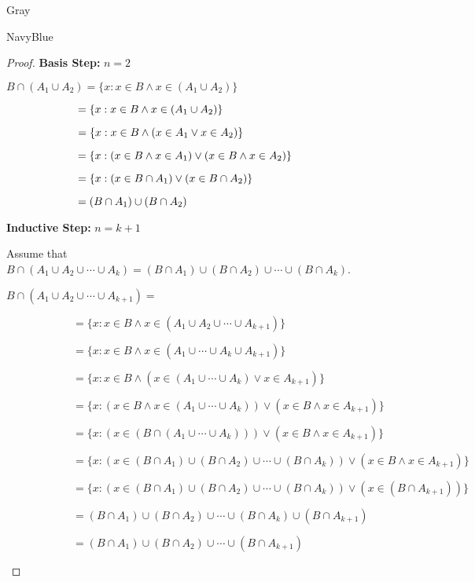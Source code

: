 \documentclass[12pt]{amsart}
\theoremstyle{named}
\newenvironment{prf}
{\medskip\begin{color}{Gray}\begin{framed}\begin{color}{NavyBlue}\begin{proof}[Proof]
\doublespacing}
{\end{proof}\end{color}\end{framed}\end{color}\medskip}
\theoremstyle{definition}
\begin{document}
\begin{prf}
	\phantom{ }

	\textbf{Basis Step:} $n = 2$
	\begin{adjustwidth}{2em}{0em}
		$B \cap (A_1 \cup A_2) = \{x : x \in B \land x \in (A_1 \cup A_2)\}$

		$\hspace{6.46em} = \{x : x \in B \land x \in (A_1 \cup A_2)\}$

		$\hspace{6.46em} = \{x : x \in B \land (x \in A_1 \lor x \in A_2)\}$

		$\hspace{6.46em} = \{x : (x \in B \land x \in A_1) \lor (x \in B \land x \in A_2)\}$

		$\hspace{6.46em} = \{x : (x \in B \cap A_1) \lor (x \in B \cap A_2)\}$

		$\hspace{6.46em} = (B \cap A_1) \cup (B \cap A_2)$
	\end{adjustwidth}

	\textbf{Inductive Step:} $n = k + 1$
	\begin{adjustwidth}{2em}{0em}
		Assume that $B\cap(A_1\cup A_2\cup \cdots\cup A_k) = (B\cap A_1)\cup (B\cap A_2) \cup \cdots \cup (B\cap A_k)$.

		\phantom{ }

		$B\cap(A_1\cup A_2\cup \cdots\cup A_{k+1}) =$

		$\hspace{6em}= \{x : x \in B \land x \in (A_1\cup A_2\cup \cdots\cup A_{k+1})\}$

		$\hspace{6em}= \{x : x \in B \land x \in (A_1\cup \cdots\cup A_k \cup A_{k+1})\}$

		$\hspace{6em}= \{x : x \in B \land (x \in (A_1\cup \cdots\cup A_k) \lor x \in A_{k+1})\}$

		$\hspace{6em}= \{x : (x \in B \land x \in (A_1\cup \cdots\cup A_k)) \lor (x \in B \land x \in A_{k+1})\}$

		$\hspace{6em}= \{x : (x \in (B \cap (A_1\cup \cdots\cup A_k))) \lor (x \in B \land x \in A_{k+1})\}$

		$\hspace{6em}= \{x : (x \in (B\cap A_1)\cup (B\cap A_2) \cup \cdots \cup (B\cap A_k)) \lor (x \in B \land x \in A_{k+1})\}$

		$\hspace{6em}= \{x : (x \in (B\cap A_1)\cup (B\cap A_2) \cup \cdots \cup (B\cap A_k)) \lor (x \in (B \cap A_{k+1}))\}$

		$\hspace{6em}= (B\cap A_1)\cup (B\cap A_2) \cup \cdots \cup (B\cap A_k) \cup (B \cap A_{k+1})$

		$\hspace{6em}= (B\cap A_1)\cup (B\cap A_2) \cup \cdots \cup (B \cap A_{k+1})$

	\end{adjustwidth}
\end{prf}
\end{document}
